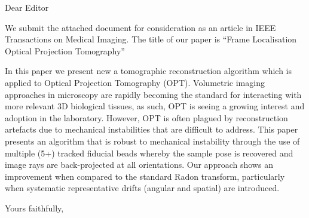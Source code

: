 \documentclass{letter}
\begin{document}
\begin{letter}{}
\opening{Dear Editor}

We submit the attached document for consideration as an article in IEEE Transactions on Medical Imaging. The title of our paper is ``Frame Localisation Optical Projection Tomography''

In this paper we present new a tomographic reconstruction algorithm which is applied to Optical Projection Tomography (OPT). Volumetric imaging approaches in microscopy are rapidly becoming the standard for interacting with more relevant 3D biological tissues, as such, OPT is seeing a growing interest and adoption in the laboratory. However, OPT is often plagued by reconstruction artefacts due to mechanical instabilities that are difficult to address. This paper presents an algorithm that is robust to mechanical instability through the use of multiple (5+) tracked fiducial beads whereby the sample pose is recovered and image rays are back-projected at all orientations. Our approach shows an improvement when compared to the standard Radon transform, particularly when systematic representative drifts (angular and spatial) are introduced.

%
%
%

%

\closing{Yours faithfully,}

%
%

\end{letter}
\end{document}
